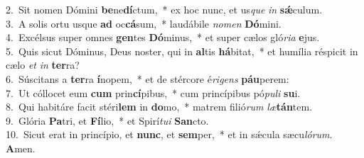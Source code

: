 {2.~}Sit nomen Dómini \textbf{be}ne\textbf{dí}ctum,~* ex hoc nunc, et us\textit{que} \textit{in} \textbf{sǽ}culum.\\
{3.~}A solis ortu usque \textbf{ad} oc\textbf{cá}sum,~* laudábile \textit{no}\textit{men} \textbf{Dó}mini.\\
{4.~}Excélsus super omnes \textbf{gen}tes \textbf{Dó}minus,~* et super cælos gló\textit{ri}\textit{a} \textbf{e}jus.\\
{5.~}Quis sicut Dóminus, Deus noster, qui in \textbf{al}tis \textbf{há}bitat,~* et humília réspicit in cælo \textit{et} \textit{in} \textbf{ter}ra?\\
{6.~}Súscitans a \textbf{ter}ra \textbf{í}nopem,~* et de stércore é\textit{ri}\textit{gens} \textbf{páu}perem:\\
{7.~}Ut cóllocet eum \textbf{cum} prin\textbf{cí}pibus,~* cum princípibus pó\textit{pu}\textit{li} \textbf{su}i.\\
{8.~}Qui habitáre facit stéri\textbf{lem} in \textbf{do}mo,~* matrem filió\textit{rum} \textit{læ}\textbf{tán}tem.\\
{9.~}Glória \textbf{Pa}tri, et \textbf{Fí}lio,~* et Spirí\textit{tu}\textit{i} \textbf{San}cto.\\
{10.~}Sicut erat in princípio, et \textbf{nunc}, et \textbf{sem}per,~* et in sǽcula sæcu\textit{ló}\textit{rum}. \textbf{A}men.\\
